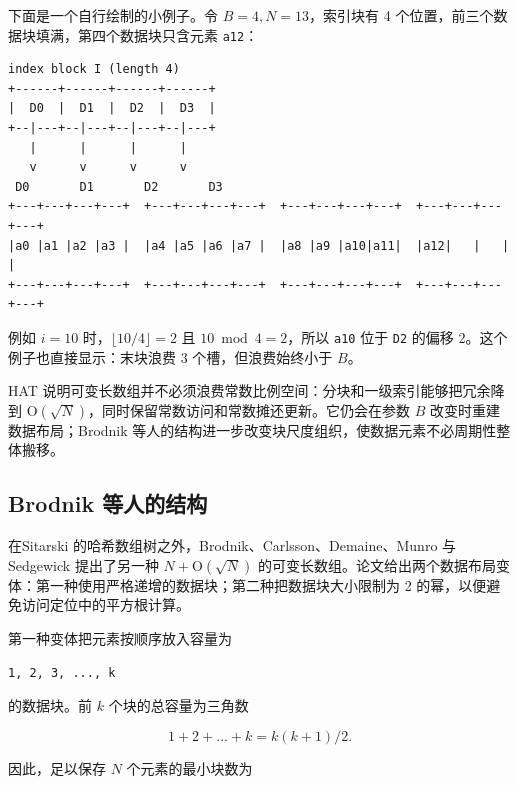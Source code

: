 \documentclass[UTF8,11pt,a4paper]{ctexart}
\begin{document}
下面是一个自行绘制的小例子。令 $B=4,N=13$，索引块有 4 个位置，前三个数据块填满，第四个数据块只含元素 \textnormal{\texttt{a12}}：\par

\begin{Verbatim}[fontsize=\scriptsize]
index block I (length 4)
+------+------+------+------+
|  D0  |  D1  |  D2  |  D3  |
+--|---+--|---+--|---+--|---+
   |      |      |      |
   v      v      v      v
 D0       D1       D2       D3
+---+---+---+---+  +---+---+---+---+  +---+---+---+---+  +---+---+---+---+
|a0 |a1 |a2 |a3 |  |a4 |a5 |a6 |a7 |  |a8 |a9 |a10|a11|  |a12|   |   |   |
+---+---+---+---+  +---+---+---+---+  +---+---+---+---+  +---+---+---+---+
\end{Verbatim}

例如 $i=10$ 时，$\lfloor 10/4\rfloor=2$ 且 $10\bmod 4=2$，所以 \textnormal{\texttt{a10}} 位于 \textnormal{\texttt{D2}} 的偏移 2。这个例子也直接显示：末块浪费 3 个槽，但浪费始终小于 $B$。\par

HAT 说明可变长数组并不必须浪费常数比例空间：分块和一级索引能够把冗余降到 $\mathrm{O}(\sqrt{N})$，同时保留常数访问和常数摊还更新。它仍会在参数 $B$ 改变时重建数据布局；Brodnik 等人的结构进一步改变块尺度组织，使数据元素不必周期性整体搬移。\par

\subsection{Brodnik 等人的结构}

在Sitarski 的哈希数组树之外，Brodnik、Carlsson、Demaine、Munro 与 Sedgewick 提出了另一种 $N+\mathrm{O}(\sqrt{N})$ 的可变长数组。论文给出两个数据布局变体：第一种使用严格递增的数据块；第二种把数据块大小限制为 2 的幂，以便避免访问定位中的平方根计算。\par

第一种变体把元素按顺序放入容量为\par

\begin{Verbatim}[fontsize=\scriptsize]
1, 2, 3, ..., k
\end{Verbatim}

的数据块。前 $k$ 个块的总容量为三角数\par

\[
  1+2+\ldots+k = k(k+1)/2.
\]

因此，足以保存 $N$ 个元素的最小块数为\par
\end{document}
